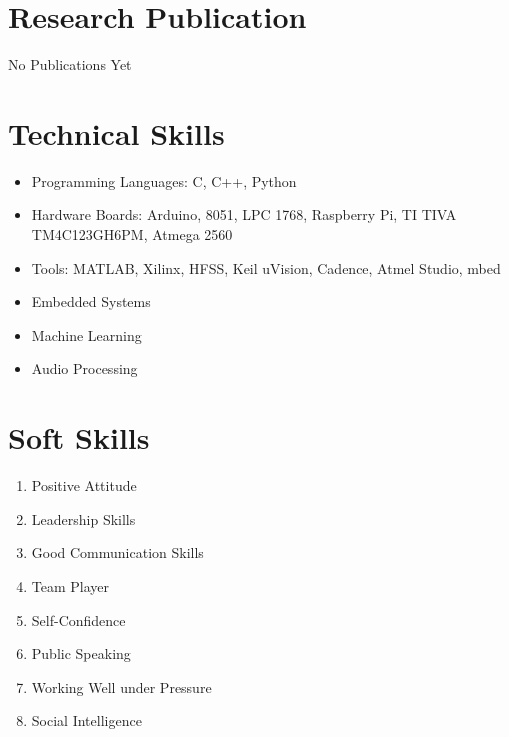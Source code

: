 \documentclass[12pt,a4paper,sans]{moderncv} %
\begin{document}

\section{Research Publication}

No Publications Yet

\section{Technical Skills}

\begin{itemize}
	\item Programming Languages: C, C++, Python
	\item Hardware Boards: Arduino, 8051, LPC 1768, Raspberry Pi, TI TIVA TM4C123GH6PM, Atmega 2560
	\item Tools: MATLAB, Xilinx, HFSS, Keil uVision, Cadence, Atmel Studio, mbed 
	\item Embedded Systems
	\item Machine Learning
	\item Audio Processing
	
\end{itemize}

\section{Soft Skills}

\begin{enumerate}
	\item Positive Attitude
	\item Leadership Skills
	\item Good Communication Skills
	\item Team Player
	\item Self-Confidence
	\item Public Speaking
	\item Working Well under Pressure
	\item Social Intelligence
	
\end{enumerate}
\end{document}
